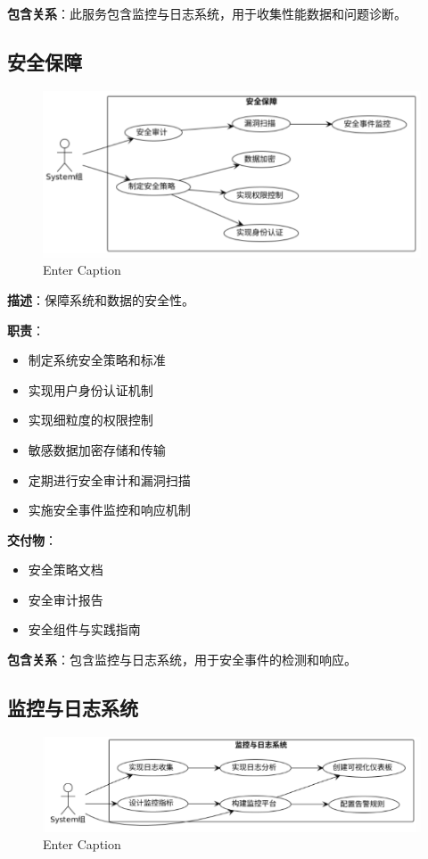 \documentclass[a4paper,12pt]{article}
\begin{document}
\textbf{包含关系}：此服务包含监控与日志系统，用于收集性能数据和问题诊断。

\subsection{安全保障}

\begin{figure}[H]
    \centering
    \includegraphics[width=0.75\linewidth]{assets/image6.png}
    \caption{Enter Caption}
    \label{fig:enter-label}
\end{figure}

\textbf{描述}：保障系统和数据的安全性。

\textbf{职责}：
\begin{itemize}
  \item 制定系统安全策略和标准
  \item 实现用户身份认证机制
  \item 实现细粒度的权限控制
  \item 敏感数据加密存储和传输
  \item 定期进行安全审计和漏洞扫描
  \item 实施安全事件监控和响应机制
\end{itemize}

\textbf{交付物}：
\begin{itemize}
  \item 安全策略文档
  \item 安全审计报告
  \item 安全组件与实践指南
\end{itemize}

\textbf{包含关系}：包含监控与日志系统，用于安全事件的检测和响应。

\subsection{监控与日志系统}

\begin{figure}[H]
    \centering
    \includegraphics[width=0.75\linewidth]{assets/image7.png}
    \caption{Enter Caption}
    \label{fig:enter-label}
\end{figure}
\end{document}
